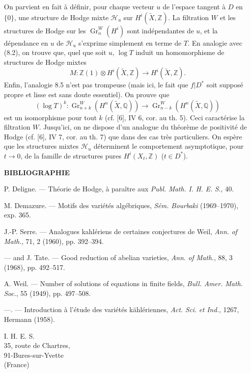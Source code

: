 \documentclass[10pt]{article}
\newcommand{\Q}{\mathbb Q}
\newcommand{\Z}{\mathbb Z}
\newcommand{\Gr}{\operatorname{Gr}}
\newcommand{\wt}{\widetilde}
\newcommand{\calH}{\mathcal H}
\begin{document}
On parvient en fait à définir, pour chaque vecteur $u$ de l'espace tangent à $D$ en $\{0\}$, une structure de Hodge mixte $\calH_u$ sur $H^i(\wt X,\Z)$. La filtration $W$ et les structures de Hodge sur les $\Gr_n^W(H^i)$ sont indépendantes de $u$, et la dépendance en $u$ de $\calH_u$ s'exprime simplement en terme de $T$. En analogie avec (8.2), on trouve que, quel que soit $u$, $\log T$ induit un homomorphisme de structures de Hodge mixtes
\[
M:\Z(1)\otimes H^i(\wt X,\Z)\longrightarrow H^i(\wt X,\Z).
\]
Enfin, l'analogie 8.5 n'est pas trompeuse (mais ici, le fait que $f|D^*$ soit supposé propre et lisse est sans doute essentiel). On prouve que
\[
(\log T)^k:\Gr_{n+k}^W(H^n(\wt X,\Q))\longrightarrow\Gr_{n-k}^W(H^n(\wt X,\Q))
\]
est un isomorphisme pour tout $k$ (cf. [6], IV 6, cor. au th. 5). Ceci caractérise la filtration $W$. Jusqu'ici, on ne dispose d'un analogue du théorème de positivité de Hodge (cf. [6], IV 7, cor. au th. 7) que dans des cas très particuliers. On espère que les structures mixtes $\calH_u$ déterminent le comportement asymptotique, pour $t\to0$, de la famille de structures pures $H^i(X_t,\Z)$ ($t\in D^*$).

\begin{center}
\bfseries BIBLIOGRAPHIE
\end{center}
\begin{enumerate}[label={[\arabic*]},leftmargin=2.2em,itemsep=0.1em]
\item P. Deligne. — Théorie de Hodge, à paraître aux \emph{Publ. Math. I. H. E. S.}, 40.
\item M. Demazure. — Motifs des variétés algébriques, \emph{Sém. Bourbaki} (1969--1970), exp. 365.
\item J.-P. Serre. — Analogues kahlériens de certaines conjectures de Weil, \emph{Ann. of Math.}, 71, 2 (1960), pp. 392--394.
\item — and J. Tate. — Good reduction of abelian varieties, \emph{Ann. of Math.}, 88, 3 (1968), pp. 492--517.
\item A. Weil. — Number of solutions of equations in finite fields, \emph{Bull. Amer. Math. Soc.}, 55 (1949), pp. 497--508.
\item —. — Introduction à l'étude des variétés kählériennes, \emph{Act. Sci. et Ind.}, 1267, Hermann (1958).
\end{enumerate}

\begin{flushleft}
I. H. E. S.\\
35, route de Chartres,\\
91-Bures-sur-Yvette\\
(France)
\end{flushleft}
\end{document}
